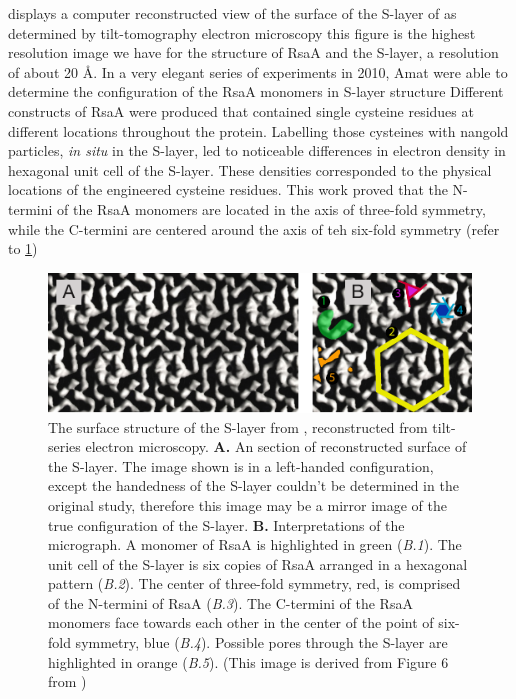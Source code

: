  displays a computer reconstructed view of the surface of the \ac{S-layer} of \caulobacter as determined by tilt-tomography electron microscopy this figure is the highest resolution image we have for the structure of RsaA and the \ac{S-layer}, a resolution of about 20 \AA{}. 
In a very elegant series of experiments in 2010, Amat \etal were able to determine the configuration of the RsaA monomers in \ac{S-layer} structure Different constructs of RsaA were produced that contained single cysteine residues at different locations throughout the protein.  Labelling those cysteines with nangold particles, \textit{in situ} in the \ac{S-layer}, led to noticeable differences in electron density in hexagonal unit cell of the \ac{S-layer}. These densities corresponded to the physical locations of the engineered cysteine residues. This work proved that the N-termini of the RsaA monomers are  located in the axis of three-fold symmetry, while the C-termini are centered around the axis of teh six-fold symmetry (refer to \cref{fig:intro-micrograph})

\begin{figure}[htb]
  \begin{center}
    \includegraphics[width=\textwidth]{intro/img/slayermicrograph.pdf}
  \end{center}
  \caption[Reconstructed surface of the \caulobacter \ac{S-layer}]{
    The surface structure of the \ac{S-layer} from \caulobacter, reconstructed from tilt-series electron microscopy. \textbf{A.} An section of reconstructed surface of the \caulobacter \ac{S-layer}. The image shown is in a left-handed configuration, except the handedness of the \ac{S-layer} couldn't be determined in the original study, therefore this image may be a mirror image of the true configuration of the \ac{S-layer}. \textbf{B.} Interpretations of the micrograph.  A monomer of RsaA is highlighted in green (\textit{B.1}).  The unit cell of the \ac{S-layer} is six copies of RsaA arranged in a hexagonal pattern (\textit{B.2}).  The center of three-fold symmetry, red, is comprised of the N-termini of RsaA (\textit{B.3}).  The C-termini of the RsaA monomers face towards each other in the center of the point of six-fold symmetry, blue (\textit{B.4}). Possible pores through the \ac{S-layer} are highlighted in orange (\textit{B.5}). (This image is derived from Figure 6 from )
  }
  \label{fig:intro-micrograph}
\end{figure}   

